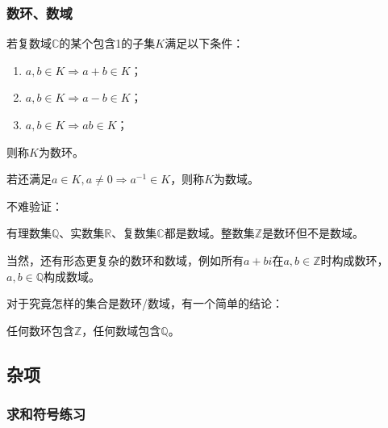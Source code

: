             \subsubsection{数环、数域}

                \begin{definition}[数环、数域]
                    若复数域$\mathbb{C}$的某个包含1的子集$K$满足以下条件：
                    \begin{enumerate}
                        \item $a,b\in K\Rightarrow a+b\in K$；
                        \item $a,b\in K\Rightarrow a-b\in K$；
                        \item $a,b\in K\Rightarrow ab\in K$；
                    \end{enumerate}
                    则称$K$为数环。

                    若还满足$a\in K, a \neq 0\Rightarrow a^{-1}\in K$，则称$K$为数域。
                \end{definition}

                不难验证：

                \begin{proposition}[数环、数域-例子]
                    有理数集$\mathbb{Q}$、实数集$\mathbb{R}$、复数集$\mathbb{C}$都是数域。整数集$\mathbb{Z}$是数环但不是数域。
                \end{proposition}

                \begin{note}
                    当然，还有形态更复杂的数环和数域，例如所有$a+bi$在$a,b\in\mathbb{Z}$时构成数环，$a,b\in\mathbb{Q}$构成数域。
                \end{note}

                对于究竟怎样的集合是数环/数域，有一个简单的结论：

                \begin{proposition}[最小的数环、数域]
                    任何数环包含$\mathbb{Z}$，任何数域包含$\mathbb{Q}$。
                \end{proposition}

        \subsection{杂项}

            \subsubsection{求和符号练习}

